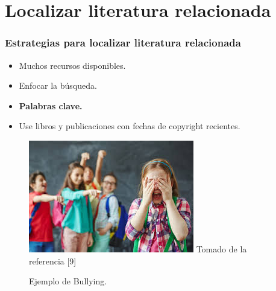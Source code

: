 \documentclass{beamer}
\begin{document}
\section{Localizar literatura relacionada} 
    \begin{frame}
    \frametitle{Estrategias para localizar literatura relacionada}
        \begin{multicols}{2}            
            \begin{itemize}
                \item Muchos recursos disponibles.  
                \item Enfocar la b\'usqueda. 
                \item \textbf{Palabras clave.} 
                \item Use libros y publicaciones con fechas de copyright recientes.                    
            \end{itemize}                 
            \begin{figure}
                \includegraphics[scale=0.60]{figures/bullying}
                \newline
                {\tiny Tomado de la referencia [9] }
                \caption{ Ejemplo de Bullying. }
            \end{figure}                    
        \end{multicols}
    \end{frame}
\end{document}
